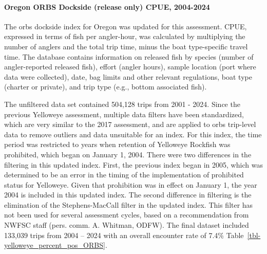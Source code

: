 \documentclass[
]{scrartcl}
\let\oldparagraph\paragraph
\renewcommand{\paragraph}[1]{\oldparagraph{#1}\mbox{}}
\begin{document}
\paragraph{Oregon ORBS Dockside (release only) CPUE,
2004-2024}\label{oregon-orbs-dockside-release-only-cpue-2004-2024}

The \gls{orbs} dockside index for Oregon was updated for this
assessment. CPUE, expressed in terms of fish per angler-hour, was
calculated by multiplying the number of anglers and the total trip time,
minus the boat type-specific travel time. The database contains
information on released fish by species (number of angler-reported
released fish), effort (angler hours), sample location (port where data
were collected), date, bag limits and other relevant regulations, boat
type (charter or private), and trip type (e.g., bottom associated fish).

The unfiltered data set contained 504,128 trips from 2001 - 2024. Since
the previous Yelloweye assessment, multiple data filters have been
standardized, which are very similar to the 2017 assessment, and are
applied to \gls{orbs} trip-level data to remove outliers and data
unsuitable for an index. For this index, the time period was restricted
to years when retention of Yelloweye Rockfish was prohibited, which
began on January 1, 2004. There were two differences in the filtering in
this updated index. First, the previous index began in 2005, which was
determined to be an error in the timing of the implementation of
prohibited status for Yelloweye. Given that prohibition was in effect on
January 1, the year 2004 is included in this updated index. The second
difference in filtering is the elimination of the Stephens-MacCall
filter in the updated index. This filter has not been used for several
assessment cycles, based on a recommendation from NWFSC staff (pers.
comm. A. Whitman, ODFW). The final dataset included 133,039 trips from
2004 -- 2024 with an overall encounter rate of 7.4\%
Table~\ref{tbl-yelloweye_percent_pos_ORBS}.
\end{document}
